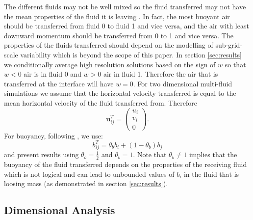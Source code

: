 \documentclass[draft]{agujournal2019}
\begin{document}
The different fluids may not be well mixed so the fluid transferred
may not have the mean properties of the fluid it is leaving \cite<as was assumed by>{WM19}.
In fact, the most buoyant air should be transferred from fluid 0 to
fluid 1 and vice versa, and the air with least downward momentum should
be transferred from 0 to 1 and vice versa. The properties of the fluids
transferred should depend on the modelling of sub-grid-scale variability
which is beyond the scope of this paper. In section \ref{sec:results}
we conditionally average high resolution solutions based on the sign
of $w$ so that $w<0$ air is in fluid 0 and $w>0$ air in fluid 1.
Therefore the air that is transferred at the interface will have $w=0$.
For two dimensional multi-fluid simulations we assume that the horizontal
velocity transferred is equal to the mean horizontal velocity of the
fluid transferred from. Therefore
\begin{equation}
\mathbf{u}_{ij}^{T}=\begin{pmatrix}u_{i}\\
v_{i}\\
0
\end{pmatrix}.
\end{equation}
For buoyancy, following , we use:
\begin{equation}
b_{ij}^{T}=\theta_{b}b_{i}+(1-\theta_{b})b_{j}
\end{equation}
and present results using $\theta_{b}=\frac{1}{2}$ and $\theta_{b}=1$.
Note that $\theta_{b}\ne1$ implies that the buoyancy of the fluid
transferred depends on the properties of the receiving fluid which
is not logical and can lead to unbounded values of $b_{i}$ in the
fluid that is loosing mass (as demonstrated in section \ref{sec:results}).

\subsection{Dimensional Analysis\label{subsec:dimAnal}}
\end{document}
